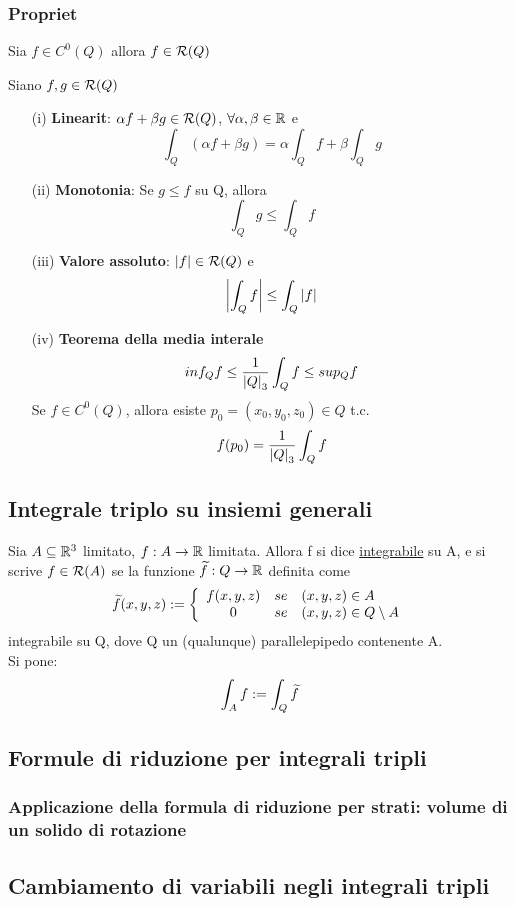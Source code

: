 \subsubsection{Propriet\aca}
\begin{theorem}
  Sia $f \in C^0\left(Q\right)$ allora $f \in \mathcal{R}(Q)$
\end{theorem}
\begin{theorem}
  Siano $f,g \in \mathcal{R} (Q)$
  \begin{itemize}
    \item[(i)] \textbf{Linearit\aca}: $\alpha f + \beta g \in \mathcal{R}(Q)$, $\forall \alpha,\beta\in\mathbb{R}$ e 
              $$\int_{Q}\left(\alpha f + \beta g\right) = \alpha \int_{Q}f + \beta \int_{Q} g$$
    \item[(ii)] \textbf{Monotonia}: Se $g\leq f$ su Q, allora $$\int_{Q} g \leq \int_{Q}f$$
    \item[(iii)] \textbf{Valore assoluto}: $\left\lvert f \right\rvert \in \mathcal{R}(Q)$ e $$\left\lvert \int_{Q}f \right\rvert \leq \int_{Q}\left\lvert f \right\rvert$$
    \item[(iv)] \textbf{Teorema della media interale} 
                $$inf_{Q} f \leq \frac{1}{\left\lvert Q \right\rvert_3}\int_{Q} f \leq sup_{Q}f$$
                Se $f \in C^0(Q)$, allora esiste $p_0 = (x_0,y_0,z_0)\in Q$ t.c. 
                $$f(p_0) = \frac{1}{\left\lvert Q \right\rvert_3}\int_{Q} f$$
  \end{itemize}
\end{theorem}
\subsection{Integrale triplo su insiemi generali}
\begin{definition}
  Sia $A\subseteq \mathbb{R}^3$ limitato, $f: A \to \mathbb{R}$ limitata. Allora f si dice \underline{integrabile}
  su A, e si scrive $f\in\mathcal{R}(A)$ se la funzione $\widetilde{f}:Q\to\mathbb{R}$ definita come
  $$ \widetilde{f}(x,y,z) := \left\{\begin{array}{ccl}
    f(x,y,z) & se & (x,y,z)\in A \\
    0 & se & (x,y,z)\in Q\setminus A \\
  \end{array}\right.$$
  \ace integrabile su Q, dove Q \ace un (qualunque) parallelepipedo contenente A.\\
  Si pone: $$\int_A f := \int_{Q} \widetilde{f}$$ 
\end{definition}
\subsection{Formule di riduzione per integrali tripli}
\subsubsection{Applicazione della formula di riduzione per strati: volume di un solido di rotazione}
\subsection{Cambiamento di variabili negli integrali tripli}